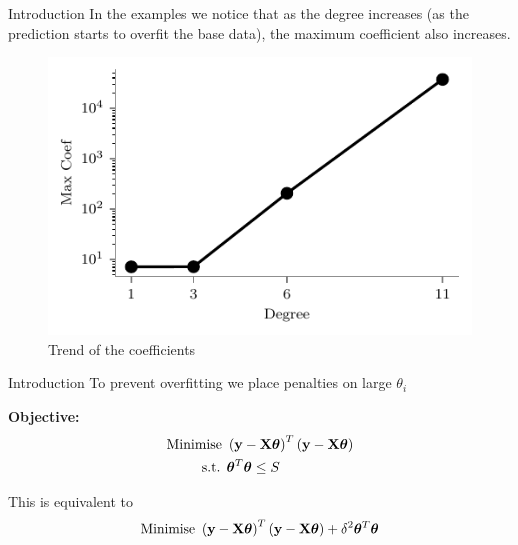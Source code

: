 \documentclass{beamer}
\begin{document}
\begin{frame}{Introduction}
\vspace{0.4cm}
In the examples we notice that as the degree increases (as the prediction starts to overfit the base data), the maximum coefficient also increases.
\begin{figure}\includegraphics[width=0.7\linewidth]{../assets/ridge/figures/lin_plot_coef.pdf}\caption{Trend of the coefficients}\end{figure}

\end{frame}
 
\begin{frame}{Introduction}
\vspace{0.4cm}
To prevent overfitting we place penalties on large $\theta_i$
\pause
 \\ \bigskip
\begin{tcolorbox}
\textbf{Objective:}
\begin{align*}
\text{Minimise } & \left(\mathbf{y}-\mathbf{X}\boldsymbol{\theta}\right)^T\left(\mathbf{y}-\mathbf{X}\boldsymbol{\theta}\right) \\
\text{s.t. } & \boldsymbol{\theta} ^T\boldsymbol{\theta} \leq S
\end{align*}
\end{tcolorbox}
\pause
This is equivalent to \vspace{-0.4cm}
$$
\text{Minimise } \left(\mathbf{y}-\mathbf{X}\boldsymbol{\theta}\right)^T\left(\mathbf{y}-\mathbf{X}\boldsymbol{\theta}\right) + \delta ^2\boldsymbol{\theta} ^T\boldsymbol{\theta}
$$
\end{frame}  
\end{document}
